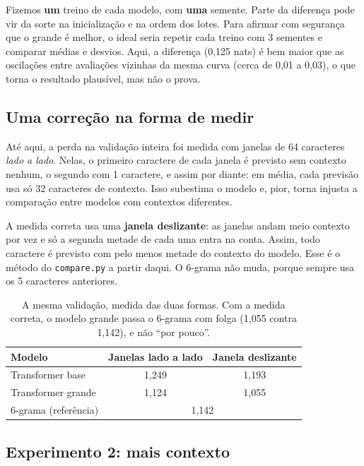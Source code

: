 \begin{atencao}
Fizemos \textbf{um} treino de cada modelo, com \textbf{uma} semente. Parte da diferença pode vir da sorte na inicialização e na ordem dos lotes. Para afirmar com segurança que o grande é melhor, o ideal seria repetir cada treino com 3 sementes e comparar médias e desvios. Aqui, a diferença (0,125 nats) é bem maior que as oscilações entre avaliações vizinhas da mesma curva (cerca de 0,01 a 0,03), o que torna o resultado plausível, mas não o prova.
\end{atencao}

\subsection{Uma correção na forma de medir}

Até aqui, a perda na validação inteira foi medida com janelas de 64 caracteres \emph{lado a lado}. Nelas, o primeiro caractere de cada janela é previsto sem contexto nenhum, o segundo com 1 caractere, e assim por diante: em média, cada previsão usa só 32 caracteres de contexto. Isso subestima o modelo e, pior, torna injusta a comparação entre modelos com contextos diferentes.

A medida correta usa uma \textbf{janela deslizante}: as janelas andam meio contexto por vez e só a segunda metade de cada uma entra na conta. Assim, todo caractere é previsto com pelo menos metade do contexto do modelo. Esse é o método do \texttt{compare.py} a partir daqui. O 6-grama não muda, porque sempre usa os 5 caracteres anteriores.

\begin{table}[H]
\centering
\begin{tabular}{@{}lcc@{}}
\toprule
Modelo & Janelas lado a lado & Janela deslizante \\
\midrule
Transformer base & 1,249 & 1,193 \\
Transformer grande & 1,124 & 1,055 \\
6-grama (referência) & \multicolumn{2}{c}{1,142} \\
\bottomrule
\end{tabular}
\caption{A mesma validação, medida das duas formas. Com a medida correta, o modelo grande passa o 6-grama com folga (1,055 contra 1,142), e não ``por pouco''.}
\end{table}

\subsection{Experimento 2: mais contexto}

